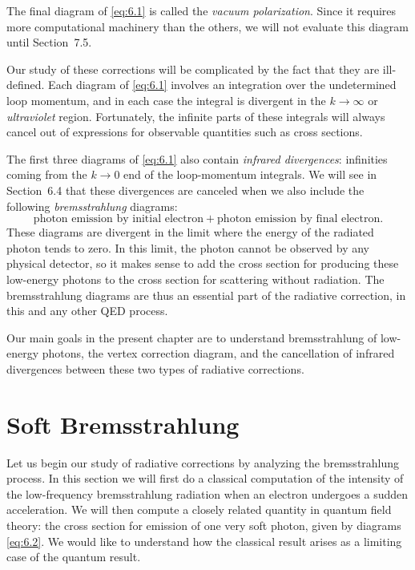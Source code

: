 The final diagram of \eqref{eq:6.1} is called the \emph{vacuum
polarization}.  Since it requires more computational machinery than the
others, we will not evaluate this diagram until Section~7.5.

Our study of these corrections will be complicated by the fact that they are
ill-defined.  Each diagram of \eqref{eq:6.1} involves an integration over the
undetermined loop momentum, and in each case the integral is divergent in the
$k\to\infty$ or \emph{ultraviolet} region.  Fortunately, the infinite parts of
these integrals will always cancel out of expressions for observable quantities
such as cross sections.

The first three diagrams of \eqref{eq:6.1} also contain \emph{infrared
divergences}: infinities coming from the $k\to 0$ end of the loop-momentum
integrals.  We will see in Section~6.4 that these divergences are canceled
when we also include the following \emph{bremsstrahlung} diagrams:
\begin{equation}
  \text{photon emission by initial electron} + \text{photon emission by
    final electron} .
  \label{eq:6.2}
\end{equation}
These diagrams are divergent in the limit where the energy of the radiated
photon tends to zero.  In this limit, the photon cannot be observed by any
physical detector, so it makes sense to add the cross section for producing
these low-energy photons to the cross section for scattering without
radiation.  The bremsstrahlung diagrams are thus an essential part of the
radiative correction, in this and any other QED process.

Our main goals in the present chapter are to understand bremsstrahlung of
low-energy photons, the vertex correction diagram, and the cancellation of
infrared divergences between these two types of radiative corrections.

\section{Soft Bremsstrahlung}

Let us begin our study of radiative corrections by analyzing the
bremsstrahlung process.  In this section we will first do a classical
computation of the intensity of the low-frequency bremsstrahlung radiation
when an electron undergoes a sudden acceleration.  We will then compute a
closely related quantity in quantum field theory: the cross section for
emission of one very soft photon, given by diagrams \eqref{eq:6.2}.  We would
like to understand how the classical result arises as a limiting case of the
quantum result.

